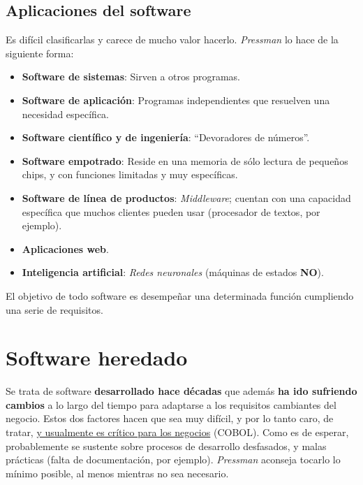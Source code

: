 \subsection{Aplicaciones del software}
Es difícil clasificarlas y carece de mucho valor hacerlo. \textit{Pressman} lo hace de la siguiente forma:
\begin{itemize}
    \item \textbf{Software de sistemas}: Sirven a otros programas.
    \item \textbf{Software de aplicación}: Programas independientes que resuelven una necesidad específica.
    \item \textbf{Software científico y de ingeniería}: ``Devoradores de números''.
    \item \textbf{Software empotrado}: Reside en una memoria de sólo lectura de pequeños chips, y con funciones limitadas y muy específicas.
    \item \textbf{Software de línea de productos}: \textit{Middleware}; cuentan con una capacidad específica que muchos clientes pueden usar (procesador de textos, por ejemplo).
    \item \textbf{Aplicaciones web}.
    \item \textbf{Inteligencia artificial}: \textit{Redes neuronales} (máquinas de estados \textbf{NO}).
\end{itemize}
El objetivo de todo software es desempeñar una determinada función cumpliendo una serie de requisitos.

\section{Software heredado}
Se trata de software \textbf{desarrollado hace décadas} %
que además \textbf{ha ido sufriendo cambios} a lo largo del tiempo para adaptarse a los requisitos cambiantes del negocio. Estos dos factores hacen que sea muy difícil, y por lo tanto caro, de tratar, \uline{y usualmente es crítico para los negocios} (COBOL). Como es de esperar, probablemente se sustente sobre procesos de desarrollo desfasados, y malas prácticas (falta de documentación, por ejemplo). \textit{Pressman} aconseja tocarlo lo mínimo posible, al menos mientras no sea necesario.

